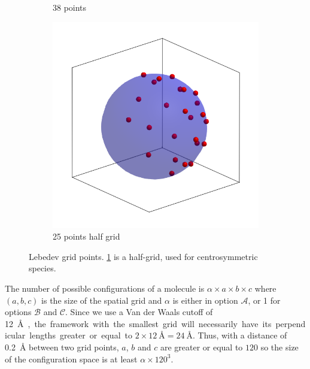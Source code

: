 \documentclass[main.tex]{subfiles}
\begin{document}
\begin{figure}
\begin{subfigure}{0.2\linewidth}
		\caption{38 points}
	\end{subfigure}\hfill%
	\begin{subfigure}{0.2\linewidth}
		\centering
		\includegraphics[width=\linewidth]{figures/gcmc/lebedev_25_symm}
		\caption{25 points half grid}\label{fig:haldgridlebedev}
	\end{subfigure}\hfill
	\caption{Lebedev grid points. \cref{fig:haldgridlebedev} is a half-grid, used for centrosymmetric species.}\label{fig:lebedev}
\end{figure}

The number of possible configurations of a molecule is $\alpha\times a\times b\times c$ where $(a,b,c)$ is the size of the spatial grid and $\alpha$ is either \Nleb in option $\mathscr A$, or 1 for options $\mathscr B$ and $\mathscr C$. Since we use a Van der Waals cutoff of \qty{12}\angstrom, the framework with the smallest grid will necessarily have its perpendicular lengths greater or equal to $2\times\qty{12}\angstrom = \qty{24}\angstrom$. Thus, with a distance of \qty{0.2}{\angstrom} between two grid points, $a$, $b$ and $c$ are greater or equal to $120$ so the size of the configuration space is at least $\alpha\times120^3$.
\end{document}
